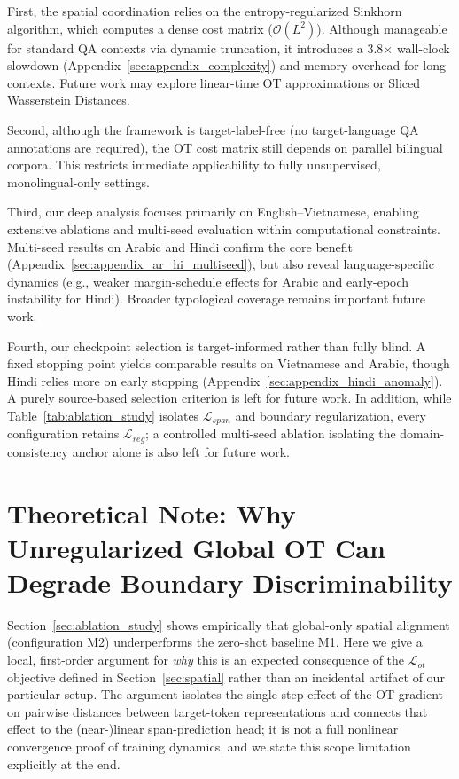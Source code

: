 \documentclass[11pt]{article}
\begin{document}
First, the spatial coordination relies on the entropy-regularized Sinkhorn algorithm, which computes a dense cost matrix ($\mathcal{O}(L^2)$). Although manageable for standard QA contexts via dynamic truncation, it introduces a 3.8$\times$ wall-clock slowdown (Appendix~\ref{sec:appendix_complexity}) and memory overhead for long contexts. Future work may explore linear-time OT approximations or Sliced Wasserstein Distances.

Second, although the framework is target-label-free (no target-language QA annotations are required), the OT cost matrix still depends on parallel bilingual corpora. This restricts immediate applicability to fully unsupervised, monolingual-only settings.

Third, our deep analysis focuses primarily on English–Vietnamese, enabling extensive ablations and multi-seed evaluation within computational constraints. Multi-seed results on Arabic and Hindi confirm the core benefit (Appendix~\ref{sec:appendix_ar_hi_multiseed}), but also reveal language-specific dynamics (e.g., weaker margin-schedule effects for Arabic and early-epoch instability for Hindi). Broader typological coverage remains important future work.

Fourth, our checkpoint selection is target-informed rather than fully blind. A fixed stopping point yields comparable results on Vietnamese and Arabic, though Hindi relies more on early stopping (Appendix~\ref{sec:appendix_hindi_anomaly}). A purely source-based selection criterion is left for future work. In addition, while Table~\ref{tab:ablation_study} isolates $\mathcal{L}_{span}$ and boundary regularization, every configuration retains $\mathcal{L}_{reg}$; a controlled multi-seed ablation isolating the domain-consistency anchor alone is also left for future work.


%



\appendix

\section{Theoretical Note: Why Unregularized Global OT Can Degrade Boundary Discriminability}
\label{sec:appendix_ot_theory}

Section~\ref{sec:ablation_study} shows empirically that global-only spatial alignment (configuration M2) underperforms the zero-shot baseline M1. Here we give a local, first-order argument for \emph{why} this is an expected consequence of the $\mathcal{L}_{ot}$ objective defined in Section~\ref{sec:spatial} rather than an incidental artifact of our particular setup. The argument isolates the single-step effect of the OT gradient on pairwise distances between target-token representations and connects that effect to the (near-)linear span-prediction head; it is not a full nonlinear convergence proof of training dynamics, and we state this scope limitation explicitly at the end.
\end{document}
